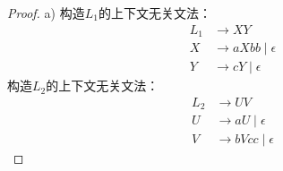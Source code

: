 \begin{proof}
    a) 构造$L_1$的上下文无关文法：
    \begin{align*}
        L_1 &\rightarrow XY\\
        X &\rightarrow aXbb \mid \epsilon\\
        Y &\rightarrow cY \mid \epsilon
    \end{align*}
    构造$L_2$的上下文无关文法：
    \begin{align*}
        L_2 &\rightarrow UV\\
        U &\rightarrow aU \mid \epsilon\\
        V &\rightarrow bVcc \mid \epsilon
    \end{align*}
\end{proof}